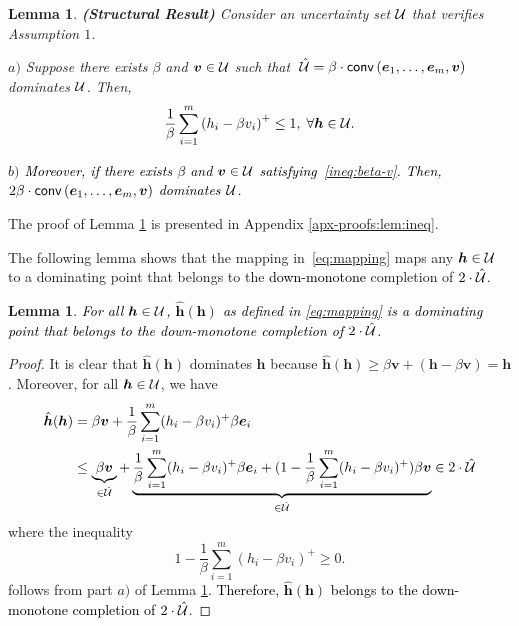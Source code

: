 \documentclass[11pt]{article}
\theoremstyle{plain}
\newtheorem{lemma}[theorem]{Lemma}
\theoremstyle{definition}
\numberwithin{equation}{section}%
\numberwithin{equation}{section}%
\newcommand{\mb}[1]{\ensuremath{\boldsymbol{#1}}}
\newcommand*{\red}{\textcolor{black}}
\begin{document}
\begin{lemma}{\bf (Structural Result)} \label{lem:ineq}
Consider an uncertainty set ${\cal U}$ that verifies Assumption $1$.

{\bf $a)$}
Suppose there exists $ \beta $ and $ \mb v \in {\cal U}$ such that
$ \;  \hat{\cal U} = \beta \cdot {\sf conv } \left( \mb e_1,\ldots,\mb e_m, \mb v \right)$ dominates $\cal U $. Then,
\begin{equation} \label{ineq:beta-v}
\frac{1}{\beta} \sum_{i=1}^m \left( h_i -\beta v_i  \right)^{+} \leq 1, \; \forall \mb h \in {\cal U}.
\end{equation}

{\bf $b)$} \red{Moreover, if there exists $\beta $ and $ \mb v \in {\cal U}$ satisfying~\eqref{ineq:beta-v}.
 Then,\\  $2\beta \cdot {\sf conv } \left( \mb e_1,\ldots,\mb e_m, \mb v \right)$ dominates ${\cal U} $.}
\end{lemma}
The proof of Lemma \ref{lem:ineq} is presented in Appendix \ref{apx-proofs:lem:ineq}.

The following lemma shows that the mapping in~\eqref{eq:mapping} maps any $\mb h \in {\cal U}$ to a dominating point that belongs to the \red{down-monotone} completion of $2 \cdot \hat{\cal U}$.
 \begin{lemma} \label{lem:2U}
 \red{For all $ \mb h \in {\cal U}$, $  \mb{ \hat{h}}(\mb h) $ as defined in \eqref{eq:mapping} is a dominating point that belongs to the down-monotone completion of $2 \cdot \hat{\cal U}$}.
 \end{lemma}
 \begin{proof}
  It is clear that $\mb{ \hat{h}}(\mb h) $ dominates $ \mb h$ because $\mb{ \hat{h}}(\mb h) \geq \beta \mb v + ( \mb h - \beta \mb v ) = \mb h $.
  Moreover,  for all $ \mb h \in {\cal U}$, we have
\red{
\begin{align*}
\hat{\mb h}(\mb h) &= \beta \mb v + \frac{1}{\beta} \sum_{i=1}^m ( h_i - \beta v_i )^+ \beta \mb e_i \\
& \leq \underbrace{ \beta \mb v }_{\in \hat{\cal U} }+ \underbrace{\frac{1}{\beta} \sum_{i=1}^m ( h_i - \beta v_i )^+ \beta \mb e_i + ( 1-  \frac{1}{\beta}\sum_{i=1}^m ( h_i - \beta v_i )^+ ) \beta \mb v }_{\in \hat{\cal U} } \in 2 \cdot \hat{\cal U}
\end{align*}}
where the inequality
$$ 1- \frac{1}{\beta} \sum_{i=1}^m (  h_i - \beta  v_i )^+ \geq 0.$$
follows from part $a)$ of Lemma \ref{lem:ineq}.
 \red{Therefore, $  \mb{ \hat{h}}(\mb h) $ belongs to the down-monotone completion of $2 \cdot \hat{\cal U}$}.
   \end{proof}
\end{document}
